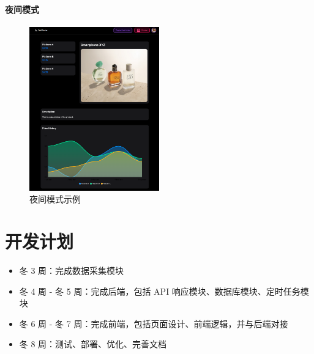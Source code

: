 \subsubsection{夜间模式}

\begin{figure}[H]
\centering
\includegraphics[width=0.5\textwidth]{assets/design/darkmode.png}
\caption{夜间模式示例}
\end{figure}

\chapter{开发计划}

\begin{itemize}
  \item 冬 3 周：完成数据采集模块
  \item 冬 4 周 - 冬 5 周：完成后端，包括 API 响应模块、数据库模块、定时任务模块
  \item 冬 6 周 - 冬 7 周：完成前端，包括页面设计、前端逻辑，并与后端对接
  \item 冬 8 周：测试、部署、优化、完善文档
\end{itemize}
